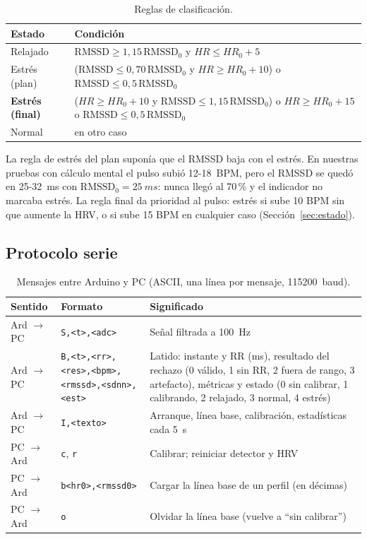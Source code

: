 \documentclass[11pt,a4paper]{article}
\begin{document}
\begin{table}[H]
\centering\small
\caption{Reglas de clasificación.}
\label{tab:estado}
\begin{tabularx}{\textwidth}{lX}
\toprule
Estado & Condición \\
\midrule
Relajado & $\mathrm{RMSSD} \ge 1{,}15\,\mathrm{RMSSD}_0$ y $HR \le HR_0 + 5$ \\
Estrés (plan) & ($\mathrm{RMSSD} \le 0{,}70\,\mathrm{RMSSD}_0$ y $HR \ge HR_0 + 10$) o $\mathrm{RMSSD} \le 0{,}5\,\mathrm{RMSSD}_0$ \\
\textbf{Estrés (final)} & ($HR \ge HR_0 + 10$ y $\mathrm{RMSSD} \le 1{,}15\,\mathrm{RMSSD}_0$) o $HR \ge HR_0 + 15$ o $\mathrm{RMSSD} \le 0{,}5\,\mathrm{RMSSD}_0$ \\
Normal & en otro caso \\
\bottomrule
\end{tabularx}
\end{table}

La regla de estrés del plan suponía que el RMSSD baja con el estrés. En nuestras pruebas con
cálculo mental el pulso subió 12-\qty{18}{BPM}, pero el RMSSD se quedó en 25-\qty{32}{ms}
con $\mathrm{RMSSD}_0 = \qty{25}{ms}$: nunca llegó al 70\,\% y el indicador no marcaba estrés.
La regla final da prioridad al pulso: estrés si sube 10 BPM sin que aumente la HRV, o si sube
15 BPM en cualquier caso (Sección~\ref{sec:estado}).

\subsection{Protocolo serie}

\begin{table}[H]
\centering\small
\caption{Mensajes entre Arduino y PC (ASCII, una línea por mensaje, \qty{115200}{baud}).}
\label{tab:protocolo}
\begin{tabularx}{\textwidth}{llX}
\toprule
Sentido & Formato & Significado \\
\midrule
Ard $\to$ PC & \texttt{S,<t>,<adc>} & Señal filtrada a \qty{100}{Hz} \\
Ard $\to$ PC & \texttt{B,<t>,<rr>,<res>,<bpm>,<rmssd>,<sdnn>,<est>} & Latido: instante y RR (ms), resultado del rechazo (0 válido, 1 sin RR, 2 fuera de rango, 3 artefacto), métricas y estado (0 sin calibrar, 1 calibrando, 2 relajado, 3 normal, 4 estrés) \\
Ard $\to$ PC & \texttt{I,<texto>} & Arranque, línea base, calibración, estadísticas cada \qty{5}{s} \\
PC $\to$ Ard & \texttt{c}, \texttt{r} & Calibrar; reiniciar detector y HRV \\
PC $\to$ Ard & \texttt{b<hr0>,<rmssd0>} & Cargar la línea base de un perfil (en décimas) \\
PC $\to$ Ard & \texttt{o} & Olvidar la línea base (vuelve a ``sin calibrar'') \\
\bottomrule
\end{tabularx}
\end{table}
\end{document}
